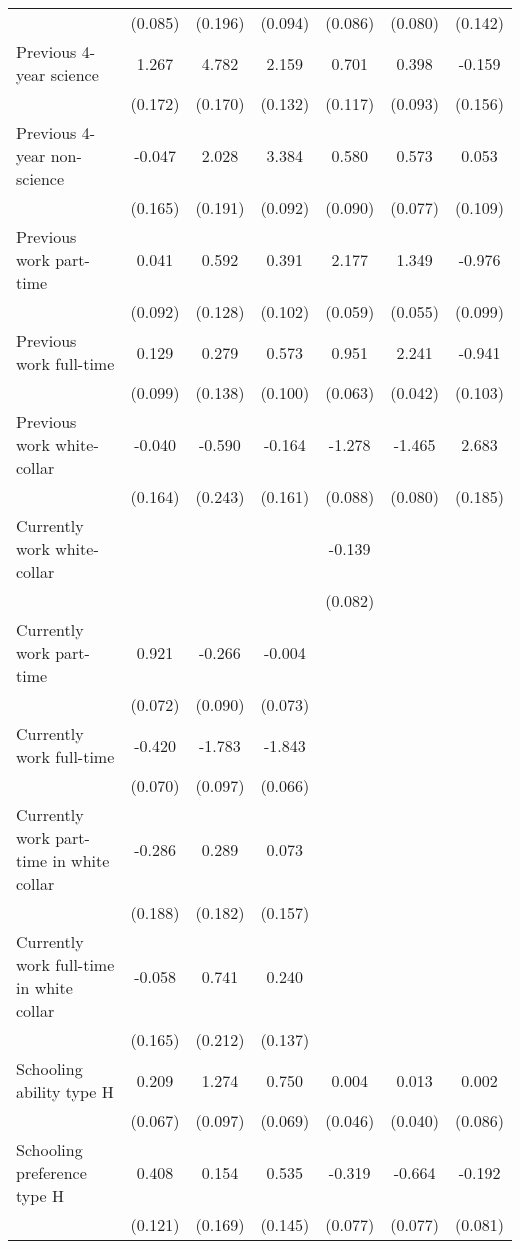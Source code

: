 \begin{landscape}
\begin{ThreePartTable}
\begin{longtable}{lcccccc}
 & (0.085) & (0.196) & (0.094) & (0.086) & (0.080) & (0.142) \\ 
Previous 4-year science & 1.267 & 4.782 & 2.159 & 0.701 & 0.398 & -0.159 \\ 
 & (0.172) & (0.170) & (0.132) & (0.117) & (0.093) & (0.156) \\ 
Previous 4-year non-science & -0.047 & 2.028 & 3.384 & 0.580 & 0.573 & 0.053 \\ 
 & (0.165) & (0.191) & (0.092) & (0.090) & (0.077) & (0.109) \\ 
Previous work part-time & 0.041 & 0.592 & 0.391 & 2.177 & 1.349 & -0.976 \\ 
 & (0.092) & (0.128) & (0.102) & (0.059) & (0.055) & (0.099) \\ 
Previous work full-time & 0.129 & 0.279 & 0.573 & 0.951 & 2.241 & -0.941 \\ 
 & (0.099) & (0.138) & (0.100) & (0.063) & (0.042) & (0.103) \\ 
Previous work white-collar & -0.040 & -0.590 & -0.164 & -1.278 & -1.465 & 2.683 \\ 
 & (0.164) & (0.243) & (0.161) & (0.088) & (0.080) & (0.185) \\ 
Currently work white-collar &  &  &  & -0.139 &  &  \\ 
 &  &  &  & (0.082) &  &  \\ 
Currently work part-time & 0.921 & -0.266 & -0.004 &  &  &  \\ 
 & (0.072) & (0.090) & (0.073) &  &  &  \\ 
Currently work full-time & -0.420 & -1.783 & -1.843 &  &  &  \\ 
 & (0.070) & (0.097) & (0.066) &  &  &  \\ 
Currently work part-time in white collar & -0.286 & 0.289 & 0.073 &  &  &  \\ 
 & (0.188) & (0.182) & (0.157) &  &  &  \\ 
Currently work full-time in white collar & -0.058 & 0.741 & 0.240 &  &  &  \\ 
 & (0.165) & (0.212) & (0.137) &  &  &  \\ 
Schooling ability type H & 0.209 & 1.274 & 0.750 & 0.004 & 0.013 & 0.002 \\ 
 & (0.067) & (0.097) & (0.069) & (0.046) & (0.040) & (0.086) \\ 
Schooling preference type H & 0.408 & 0.154 & 0.535 & -0.319 & -0.664 & -0.192 \\ 
 & (0.121) & (0.169) & (0.145) & (0.077) & (0.077) & (0.081) \\ 

\end{longtable}
\end{ThreePartTable}
\end{landscape}
